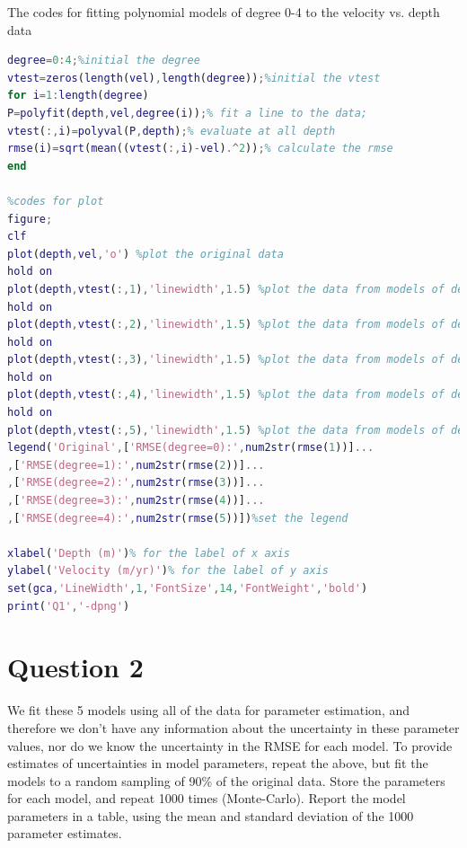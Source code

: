\documentclass[
	12pt, %
]{fphw}
\begin{document}
The codes for fitting polynomial models of degree 0-4 to the velocity vs. depth data


\begin{lstlisting}[language=Matlab,escapeinside=``]
degree=0:4;%initial the degree
vtest=zeros(length(vel),length(degree));%initial the vtest
for i=1:length(degree)   
P=polyfit(depth,vel,degree(i));% fit a line to the data;
vtest(:,i)=polyval(P,depth);% evaluate at all depth
rmse(i)=sqrt(mean((vtest(:,i)-vel).^2));% calculate the rmse
end

%codes for plot
figure;
clf
plot(depth,vel,'o') %plot the original data
hold on
plot(depth,vtest(:,1),'linewidth',1.5) %plot the data from models of degree 0
hold on
plot(depth,vtest(:,2),'linewidth',1.5) %plot the data from models of degree 1
hold on
plot(depth,vtest(:,3),'linewidth',1.5) %plot the data from models of degree 2
hold on
plot(depth,vtest(:,4),'linewidth',1.5) %plot the data from models of degree 3
hold on
plot(depth,vtest(:,5),'linewidth',1.5) %plot the data from models of degree 4
legend('Original',['RMSE(degree=0):',num2str(rmse(1))]...
,['RMSE(degree=1):',num2str(rmse(2))]...
,['RMSE(degree=2):',num2str(rmse(3))]...
,['RMSE(degree=3):',num2str(rmse(4))]...
,['RMSE(degree=4):',num2str(rmse(5))])%set the legend

xlabel('Depth (m)')% for the label of x axis
ylabel('Velocity (m/yr)')% for the label of y axis
set(gca,'LineWidth',1,'FontSize',14,'FontWeight','bold')
print('Q1','-dpng')

\end{lstlisting}



\section*{Question 2}

\begin{problem}
	We fit these 5 models using all of the data for parameter estimation, and therefore we don't have any
	information about the uncertainty in these parameter values, nor do we know the uncertainty in the RMSE
	for each model. To provide estimates of uncertainties in model parameters, repeat the above, but fit the
	models to a random sampling of 90\% of the original data. Store the parameters for each model, and repeat
	1000 times (Monte-Carlo). Report the model parameters in a table, using the mean and standard deviation
	of the 1000 parameter estimates.
	
\end{problem}
\end{document}
